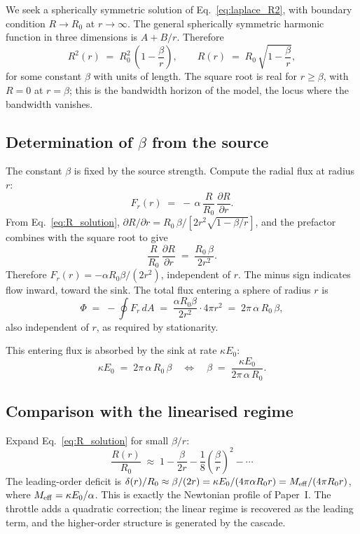 \documentclass[11pt,a4paper]{article}
\begin{document}
We seek a spherically symmetric solution of
Eq.~\eqref{eq:laplace_R2}, with boundary condition
$R \to R_0$ at $r \to \infty$. The general spherically
symmetric harmonic function in three dimensions is $A + B/r$.
Therefore
\begin{equation}
R^2(r) \;=\; R_0^2\,\left(1 - \frac{\beta}{r}\right),
\qquad
R(r) \;=\; R_0\,\sqrt{1 - \frac{\beta}{r}},
\label{eq:R_solution}
\end{equation}
for some constant $\beta$ with units of length. The square
root is real for $r \ge \beta$, with $R = 0$ at $r = \beta$;
this is the bandwidth horizon of the model, the locus where the
bandwidth vanishes.

\subsection{Determination of $\beta$ from the source}

The constant $\beta$ is fixed by the source strength. Compute
the radial flux at radius $r$:
\[
F_r(r) \;=\; -\,\alpha\,\frac{R}{R_0}\,\frac{\partial R}{\partial r}.
\]
From Eq.~\eqref{eq:R_solution}, $\partial R/\partial r =
R_0\, \beta / [2 r^2 \sqrt{1 - \beta/r}]$, and the prefactor
combines with the square root to give
\[
\frac{R}{R_0}\,\frac{\partial R}{\partial r}
\;=\; \frac{R_0\,\beta}{2 r^2}.
\]
Therefore $F_r(r) = -\alpha R_0 \beta / (2 r^2)$, independent
of $r$. The minus sign indicates flow inward, toward the
sink. The total flux entering a sphere of radius $r$ is
\[
\Phi \;=\; -\!\!\oint F_r\,dA
\;=\; \frac{\alpha R_0 \beta}{2 r^2}\cdot 4\pi r^2
\;=\; 2\pi\,\alpha\, R_0\, \beta,
\]
also independent of $r$, as required by stationarity.

This entering flux is absorbed by the sink at rate $\kappa E_0$:
\begin{equation}
\kappa E_0 \;=\; 2\pi\,\alpha\, R_0\, \beta
\quad\Longleftrightarrow\quad
\boxed{\beta \;=\; \frac{\kappa E_0}{2\pi\,\alpha\, R_0}.}
\label{eq:beta_def}
\end{equation}

\subsection{Comparison with the linearised regime}

Expand Eq.~\eqref{eq:R_solution} for small $\beta/r$:
\[
\frac{R(r)}{R_0} \;\approx\; 1 - \frac{\beta}{2 r}
- \frac{1}{8}\left(\frac{\beta}{r}\right)^2 - \cdots
\]
The leading-order deficit is $\delta(r)/R_0 \approx \beta/(2r) =
\kappa E_0 / (4\pi \alpha R_0 r) = M_{\rm eff} / (4\pi R_0 r)$,
where $M_{\rm eff} = \kappa E_0/\alpha$. This is exactly the
Newtonian profile of Paper~I. The throttle adds a quadratic
correction; the linear regime is recovered as the leading
term, and the higher-order structure is generated by the
cascade.
\end{document}
